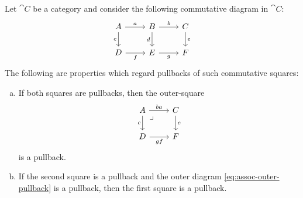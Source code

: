 \begin{proposition}
    \label{prop:associativity-pullbacks}
    Let \(\cat C\) be a category and consider the following commutative diagram in
    \(\cat C\):
    \[
        \begin{tikzcd}
            A \ar[r, "a"] \ar[d, "c"']
            &B \ar[r, "b"] \ar[d, "d"']
            &C \ar[d, "e"] \\
            D \ar[r, "f"']
            &E \ar[r, "g"']
            &F
        \end{tikzcd}
    \]
    The following are properties which regard pullbacks of such commutative squares:
    \begin{enumerate}[(a)]\setlength\itemsep{0em}
        \item If both squares are pullbacks, then the outer-square
              \begin{equation}\label{eq:assoc-outer-pullback}
                  \begin{tikzcd}
                      A \ar[r, "b a"] \ar[d, "c"']
                      \ar[rd, phantom, "\lrcorner", very near start]
                      &C \ar[d, "e"] \\
                      D \ar[r, "g f"']
                      &F
                  \end{tikzcd}
              \end{equation}
              is a pullback.

        \item If the second square is a pullback and the outer diagram
              \cref{eq:assoc-outer-pullback} is a pullback, then the first square is a
              pullback.
    \end{enumerate}
\end{proposition}

